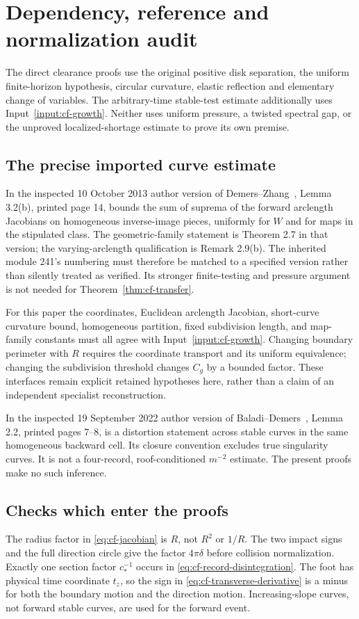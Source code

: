 \section{Dependency, reference and normalization audit}
\label{sec:cf-audit}
The direct clearance proofs use the original positive disk separation,
the uniform finite-horizon hypothesis, circular curvature, elastic
reflection and elementary change of variables. The arbitrary-time
stable-test estimate additionally uses Input~\ref{input:cf-growth}.
Neither uses uniform pressure, a twisted spectral gap, or the
unproved localized-shortage estimate to prove its own premise.

\subsection{The precise imported curve estimate}
In the inspected 10 October 2013 author version of
Demers--Zhang~\cite{DZUniform}, Lemma 3.2(b), printed page 14,
bounds the sum of suprema of the forward arclength Jacobians on
homogeneous inverse-image pieces, uniformly for $W$ and for maps
in the stipulated class. The geometric-family statement is Theorem
2.7 in that version; the varying-arclength qualification is Remark
2.9(b). The inherited module 241's numbering must therefore be
matched to a specified version rather than silently treated as
verified. Its stronger finite-testing and pressure argument is not
needed for Theorem~\ref{thm:cf-transfer}.

For this paper the coordinates, Euclidean arclength Jacobian,
short-curve curvature bound, homogeneous partition, fixed subdivision
length, and map-family constants must all agree with
Input~\ref{input:cf-growth}. Changing boundary perimeter with $R$
requires the coordinate transport and its uniform equivalence;
changing the subdivision threshold changes $C_g$ by a bounded
factor. These interfaces remain explicit retained hypotheses here,
rather than a claim of an independent specialist reconstruction.

In the inspected 19 September 2022 author version of
Baladi--Demers~\cite{BDPressure}, Lemma 2.2, printed pages 7--8,
is a distortion statement across stable curves in the same
homogeneous backward cell. Its closure convention excludes true
singularity curves. It is not a four-record, roof-conditioned
$m^{-2}$ estimate. The present proofs make no such inference.

\subsection{Checks which enter the proofs}
The radius factor in \eqref{eq:cf-jacobian} is $R$, not $R^2$ or
$1/R$. The two impact signs and the full direction circle give the
factor $4\pi\delta$ before collision normalization. Exactly one
section factor $c_*^{-1}$ occurs in
\eqref{eq:cf-record-disintegration}. The foot has physical time
coordinate $t_z$, so the sign in
\eqref{eq:cf-transverse-derivative} is a minus for both the boundary
motion and the direction motion. Increasing-slope curves, not
forward stable curves, are used for the forward event.

